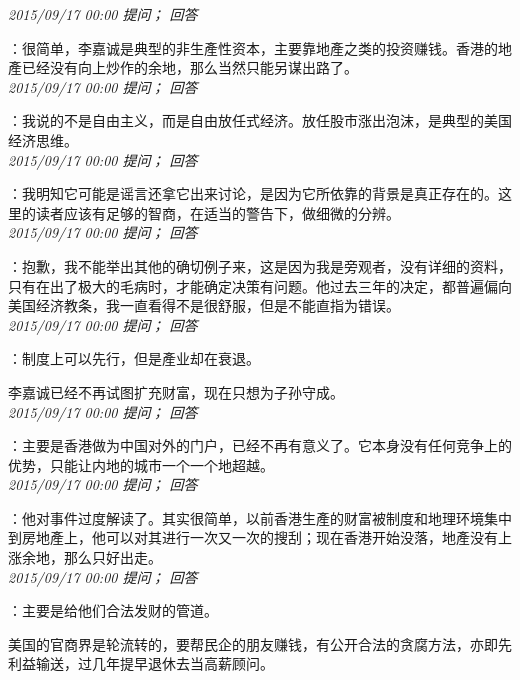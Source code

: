 \documentclass[twocolumn]{ctexart}
\begin{document}
\textit{\hfill\noindent\small 2015/09/17 00:00 提问； 回答}

：很简单，李嘉诚是典型的非生產性资本，主要靠地產之类的投资赚钱。香港的地產已经没有向上炒作的余地，那么当然只能另谋出路了。\\

\textit{\hfill\noindent\small 2015/09/17 00:00 提问； 回答}

：我说的不是自由主义，而是自由放任式经济。放任股市涨出泡沫，是典型的美国经济思维。\\

\textit{\hfill\noindent\small 2015/09/17 00:00 提问； 回答}

：我明知它可能是谣言还拿它出来讨论，是因为它所依靠的背景是真正存在的。这里的读者应该有足够的智商，在适当的警告下，做细微的分辨。\\

\textit{\hfill\noindent\small 2015/09/17 00:00 提问； 回答}

：抱歉，我不能举出其他的确切例子来，这是因为我是旁观者，没有详细的资料，只有在出了极大的毛病时，才能确定决策有问题。他过去三年的决定，都普遍偏向美国经济教条，我一直看得不是很舒服，但是不能直指为错误。\\

\textit{\hfill\noindent\small 2015/09/17 00:00 提问； 回答}

：制度上可以先行，但是產业却在衰退。

李嘉诚已经不再试图扩充财富，现在只想为子孙守成。\\

\textit{\hfill\noindent\small 2015/09/17 00:00 提问； 回答}

：主要是香港做为中国对外的门户，已经不再有意义了。它本身没有任何竞争上的优势，只能让内地的城市一个一个地超越。\\

\textit{\hfill\noindent\small 2015/09/17 00:00 提问； 回答}

：他对事件过度解读了。其实很简单，以前香港生產的财富被制度和地理环境集中到房地產上，他可以对其进行一次又一次的搜刮；现在香港开始没落，地產没有上涨余地，那么只好出走。\\

\textit{\hfill\noindent\small 2015/09/17 00:00 提问； 回答}

：主要是给他们合法发财的管道。

美国的官商界是轮流转的，要帮民企的朋友赚钱，有公开合法的贪腐方法，亦即先利益输送，过几年提早退休去当高薪顾问。
\end{document}
